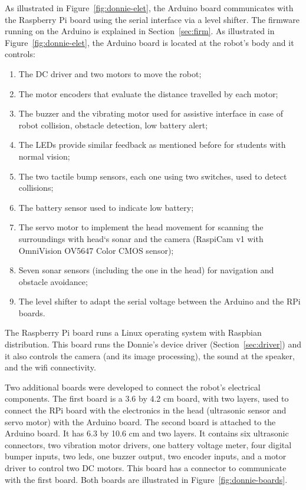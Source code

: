 As illustrated in Figure~\ref{fig:donnie-elet}, the Arduino board communicates with the Raspberry Pi board using the serial interface via a level shifter. The firmware running on the Arduino is explained in Section~\ref{sec:firm}. As illustrated in Figure~\ref{fig:donnie-elet}, the Arduino board is located at the robot's body and it controls:

\begin{enumerate}
\item The DC driver and two motors to move the robot;
\item The motor encoders that evaluate the distance travelled by each motor;
\item The buzzer and the vibrating motor used for assistive interface in case of robot collision, obstacle detection, low battery alert;
\item The LEDs provide similar feedback as mentioned before for students with normal vision;
\item The two tactile bump sensors, each one using two switches, used to detect collisions; 
\item The battery sensor used to indicate low battery;
\item The servo motor to implement the head movement for scanning the surroundings with head`s sonar and the camera (RaspiCam v1 with OmniVision OV5647 Color CMOS sensor);
\item Seven sonar sensors (including the one in the head) for navigation and obstacle avoidance;
\item The level shifter to adapt the serial voltage between the Arduino and the RPi boards.
\end{enumerate}

The Raspberry Pi board runs a Linux operating system with Raspbian distribution. This board runs the Donnie's device driver (Section~\ref{sec:driver}) and it also controls the camera (and its image processing), the sound at the speaker, and the wifi connectivity. 



Two additional boards were developed to connect the robot's electrical components. The first board is a 3.6 by 4.2 cm board, with two layers, used to connect the RPi board with the electronics in the head (ultrasonic sensor and servo motor) with the Arduino board. The second board is attached to the Arduino board. It has 6.3 by 10.6 cm and two layers. It contains six ultrasonic connectors, two vibration motor drivers, one battery voltage meter, four digital bumper inputs, two leds, one buzzer output, two encoder inputs, and a motor driver to control two DC motors. This board has a connector to communicate with the first board. Both boards are illustrated in Figure~\ref{fig:donnie-boards}.


